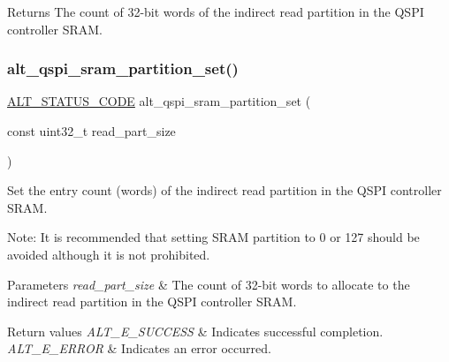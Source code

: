 \begin{DoxyReturn}{Returns}
The count of 32-\/bit words of the indirect read partition in the Q\+S\+PI controller S\+R\+AM. 
\end{DoxyReturn}
\mbox{\label{group__ALT__QSPI__CFG__SRAM_ga7852658f96558099c7c27a761e4ba2cc}} 
\subsubsection{\texorpdfstring{alt\_qspi\_sram\_partition\_set()}{alt\_qspi\_sram\_partition\_set()}}
{\footnotesize\ttfamily \mbox{\hyperlink{hwlib_8h_abdb0d369f069723ca55d6c94bcaaaa12}{A\+L\+T\+\_\+\+S\+T\+A\+T\+U\+S\+\_\+\+C\+O\+DE}} alt\+\_\+qspi\+\_\+sram\+\_\+partition\+\_\+set (\begin{DoxyParamCaption}\item[{const uint32\+\_\+t}]{read\+\_\+part\+\_\+size }\end{DoxyParamCaption})}

Set the entry count (words) of the indirect read partition in the Q\+S\+PI controller S\+R\+AM.

Note\+: It is recommended that setting S\+R\+AM partition to 0 or 127 should be avoided although it is not prohibited.


\begin{DoxyParams}{Parameters}
{\em read\+\_\+part\+\_\+size} & The count of 32-\/bit words to allocate to the indirect read partition in the Q\+S\+PI controller S\+R\+AM.\\
\hline
\end{DoxyParams}

\begin{DoxyRetVals}{Return values}
{\em A\+L\+T\+\_\+\+E\+\_\+\+S\+U\+C\+C\+E\+SS} & Indicates successful completion. \\
\hline
{\em A\+L\+T\+\_\+\+E\+\_\+\+E\+R\+R\+OR} & Indicates an error occurred. \\
\hline
\end{DoxyRetVals}
